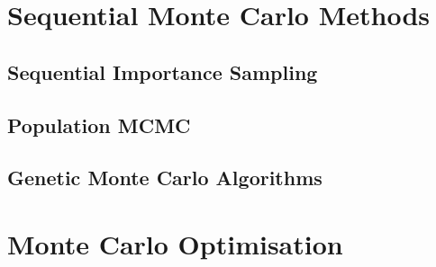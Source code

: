\section{Sequential Monte Carlo Methods}
\work

\subsection{Sequential Importance Sampling}

\subsection{Population MCMC}

\subsection{Genetic Monte Carlo Algorithms}

\section{Monte Carlo Optimisation}
\work


